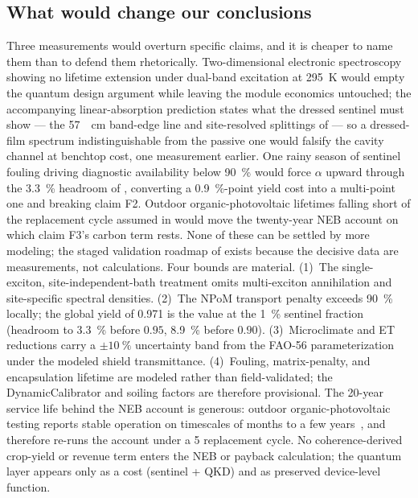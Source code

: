 \documentclass[preprint,12pt]{elsarticle}
\begin{document}
\subsection{What would change our conclusions}
Three measurements would overturn specific claims, and it is cheaper to name them than to defend them rhetorically. Two-dimensional electronic spectroscopy showing no lifetime extension under dual-band excitation at \qty{295}{\kelvin} would empty the quantum design argument while leaving the module economics untouched; the accompanying linear-absorption prediction states what the dressed sentinel must show --- the \qty{57}{\per\cm} band-edge line and site-resolved splittings of  --- so a dressed-film spectrum indistinguishable from the passive one would falsify the cavity channel at benchtop cost, one measurement earlier. One rainy season of sentinel fouling driving diagnostic availability below \qty{90}{\percent} would force $\alpha$ upward through the \qty{3.3}{\percent} headroom of , converting a \qty{0.9}{\percent}-point yield cost into a multi-point one and breaking claim F2. Outdoor organic-photovoltaic lifetimes falling short of the replacement cycle assumed in  would move the twenty-year NEB account on which claim F3's carbon term rests. None of these can be settled by more modeling; the staged validation roadmap of  exists because the decisive data are measurements, not calculations.
Four bounds are material. (1)~The single-exciton, site-independent-bath treatment omits multi-exciton annihilation and site-specific spectral densities. (2)~The NPoM transport penalty exceeds \qty{90}{\percent} locally; the global yield of \num{0.971} is the value at the \qty{1}{\percent} sentinel fraction (headroom to \qty{3.3}{\percent} before $0.95$, \qty{8.9}{\percent} before $0.90$). (3)~Microclimate and ET reductions carry a $\pm\qty{10}{\percent}$ uncertainty band from the FAO-56 parameterization under the modeled shield transmittance. (4)~Fouling, matrix-penalty, and encapsulation lifetime are modeled rather than field-validated; the DynamicCalibrator and soiling factors are therefore provisional. The 20-year service life behind the NEB account is generous: outdoor organic-photovoltaic testing reports stable operation on timescales of months to a few years~\cite{Zhang2018,Kettle2022}, and  therefore re-runs the account under a \qty{5}{\yr} replacement cycle. No coherence-derived crop-yield or revenue term enters the NEB or payback calculation; the quantum layer appears only as a cost (sentinel + QKD) and as preserved device-level function.
\end{document}
